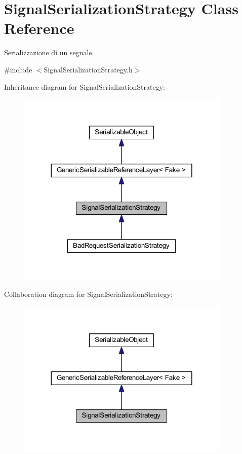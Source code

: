 \hypertarget{class_signal_serialization_strategy}{
\section{SignalSerializationStrategy Class Reference}
\label{class_signal_serialization_strategy}
}


Serializzazione di un segnale.  




{\ttfamily \#include $<$SignalSerializationStrategy.h$>$}



Inheritance diagram for SignalSerializationStrategy:\nopagebreak
\begin{figure}[H]
\begin{center}
\leavevmode
\includegraphics[width=288pt]{class_signal_serialization_strategy__inherit__graph}
\end{center}
\end{figure}


Collaboration diagram for SignalSerializationStrategy:\nopagebreak
\begin{figure}[H]
\begin{center}
\leavevmode
\includegraphics[width=288pt]{class_signal_serialization_strategy__coll__graph}
\end{center}
\end{figure}
